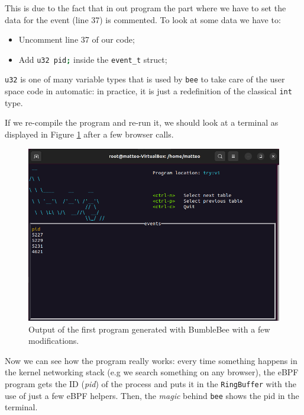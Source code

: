 This is due to the fact that in out program the part where we have to set the data for the event (line 37) is commented.
To look at some data we have to:

\begin{itemize}
	\item 
		Uncomment line 37 of our code;
	\item 
		Add \colorbox{backcolour}{\lstinline[style=commandline, language=bash, breaklines=true]|u32 pid;|} inside the \colorbox{backcolour}{\lstinline[style=commandline, language=bash, breaklines=true]|event_t|} struct;
\end{itemize}

\colorbox{backcolour}{\lstinline[style=commandline, language=bash, breaklines=true]|u32|} is one of many variable types that is used by \colorbox{backcolour}{\lstinline[style=commandline, language=bash, breaklines=true]|bee|} to take care of the user space code in automatic: in practice, it is just a redefinition of the classical \colorbox{backcolour}{\lstinline[style=commandline, language=bash, breaklines=true]|int|} type.

If we re-compile the program and re-run it, we should look at a terminal as displayed in Figure \ref{fig:bee_modified_first_program_output} after a few browser calls.

\begin{figure}[h]
	\centering
	\includegraphics[width=0.7\linewidth]{images/LinuxDevelopment/n_rb_p_working_display.png}
	\caption{Output of the first program generated with BumbleBee with a few modifications.}
	\label{fig:bee_modified_first_program_output}
\end{figure}

Now we can see how the program really works: every time something happens in the kernel networking stack (e.g we search something on any browser), the eBPF program gets the ID (\textit{pid}) of the process and puts it in the \colorbox{backcolour}{\lstinline[style=commandline, language=bash, breaklines=true]|RingBuffer|} with the use of just a few eBPF helpers.
Then, the \textit{magic} behind \colorbox{backcolour}{\lstinline[style=commandline, language=bash, breaklines=true]|bee|} shows the pid in the terminal.

